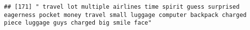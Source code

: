 \documentclass[
]{article}
\begin{document}
\begin{verbatim}
## [171] " travel lot multiple airlines time spirit guess surprised eagerness pocket money travel small luggage computer backpack charged piece luggage guys charged big smile face"                                                                                                                                                                                                                                                                                                                                                                                                                                                                                                                                                                                                                                                                                                                                                                                                                                                                                                                                                                                                                                                                                                                                                                                                                                                                                                                                                                                                                                                                                                                                                                                                                     

\end{verbatim}
\end{document}
